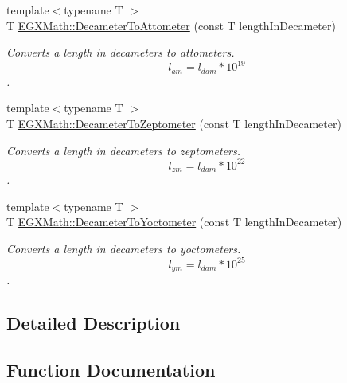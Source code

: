 \begin{DoxyCompactItemize}
{\footnotesize template$<$typename T $>$ }\\T \mbox{\hyperlink{group___e_g_x_math-_conversions-_length_conversions-_s_i-_decameter-_s_i_ga580471565f6ffb83166a8b21b2a3a01e}{E\+G\+X\+Math\+::\+Decameter\+To\+Attometer}} (const T length\+In\+Decameter)
\begin{DoxyCompactList}\small\item\em Converts a length in decameters to attometers. \[ l_{am}=l_{dam} * 10^{19} \]. \end{DoxyCompactList}\item 
{\footnotesize template$<$typename T $>$ }\\T \mbox{\hyperlink{group___e_g_x_math-_conversions-_length_conversions-_s_i-_decameter-_s_i_gaa5ec7101e385d972cd3175fab39fd2c6}{E\+G\+X\+Math\+::\+Decameter\+To\+Zeptometer}} (const T length\+In\+Decameter)
\begin{DoxyCompactList}\small\item\em Converts a length in decameters to zeptometers. \[ l_{zm}=l_{dam} * 10^{22} \]. \end{DoxyCompactList}\item 
{\footnotesize template$<$typename T $>$ }\\T \mbox{\hyperlink{group___e_g_x_math-_conversions-_length_conversions-_s_i-_decameter-_s_i_ga1e90c34b56ee230eec4a3e00a3fedbde}{E\+G\+X\+Math\+::\+Decameter\+To\+Yoctometer}} (const T length\+In\+Decameter)
\begin{DoxyCompactList}\small\item\em Converts a length in decameters to yoctometers. \[ l_{ym}=l_{dam} * 10^{25} \]. \end{DoxyCompactList}\end{DoxyCompactItemize}


\subsection{Detailed Description}


\subsection{Function Documentation}
\mbox{\label{group___e_g_x_math-_conversions-_length_conversions-_s_i-_decameter-_s_i_ga580471565f6ffb83166a8b21b2a3a01e}} 
